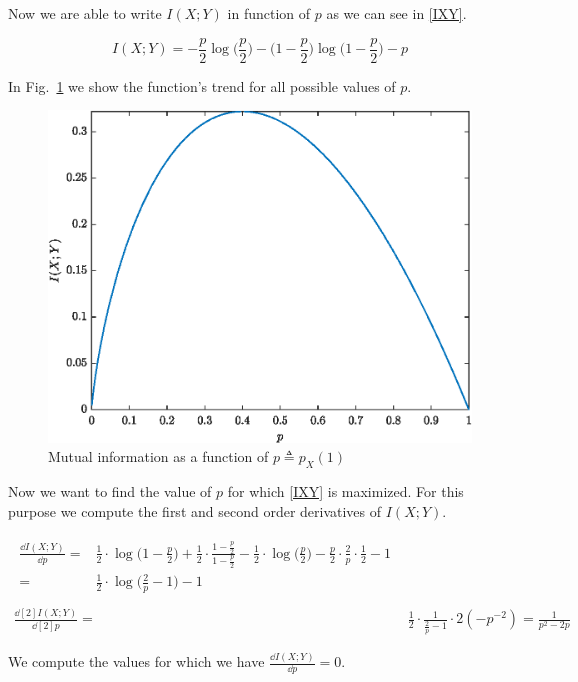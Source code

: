 Now we are able to write $I(X;Y)$ in function of $p$ as we can see in \eqref{IXY}.

\begin{equation}
	I(X;Y) = -\frac{p}{2} \log\Big(\frac{p}{2}\Big)-\Big(1-\frac{p}{2}\Big) \log \Big(1-\frac{p}{2}\Big)-p
	\label{IXY}
\end{equation}

\pagebreak

In Fig.~\ref{fig:funcinfoex1} we show the function's trend for all possible values of $p$.

\begin{figure}[t]
	\centering
	\includegraphics[width=0.7\linewidth]{img/func_info_ex1}
	\caption{Mutual information as a function of $p \triangleq p_X(1)$}
	\label{fig:funcinfoex1}
\end{figure}

Now we want to find the value of $p$ for which \eqref{IXY} is maximized. For this purpose we compute the first and second order derivatives of $I(X;Y)$.

\begin{align}
\begin{split}
\frac{\dd{I(X;Y)}}{\dd{p}}= &\frac{1}{2} \cdot \log \Big( 1 - \frac{p}{2}\Big)+ \frac{1}{2} \cdot \frac{1- \frac{p}{2}}{1-\frac{p}{2}} - \frac{1}{2} \cdot \log\Big ( \frac{p}{2}\Big)-\frac{p}{2} \cdot \frac{2}{p} \cdot \frac{1}{2} - 1 \\
= & \frac{1}{2} \cdot \log \Big ( \frac{2}{p} - 1\Big)-1
\end{split}\\\nonumber\\
%
\frac{\dd[2]{I(X;Y)}}{\dd[2]{p}}=& \frac{1}{2}\cdot \frac{1}{\frac{2}{p}-1} \cdot 2(-p^{-2})= \frac{1}{p^2-2p}
\end{align}

We compute the values for which we have $\frac{\dd{I(X;Y)}}{\dd{p}}=0$.


